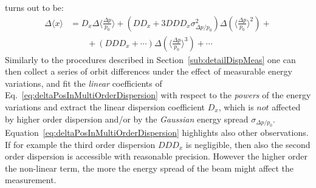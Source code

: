 turns out to be:
%
\begin{align}
\Delta \langle x \rangle &=
D_x \Delta \langle \frac{\Delta p}{p_0} \rangle +
\left( DD_x + 3 DDD_x \sigma_{\Delta p / p_0}^2 \right) \Delta \left( \langle \frac{\Delta p}{p_0} \rangle^2 \right) +
\nonumber \\
&\qquad + \left( DDD_x + \cdots \right) \Delta \left( \langle \frac{\Delta p}{p_0} \rangle^3 \right) + \cdots
\label{eq:deltaPosInMultiOrderDispersion}
\end{align}
%
Similarly to the procedures described in Section~\ref{sub:detailDispMeas} one can then
collect a series of orbit differences under the effect of measurable energy variations,
and fit the \emph{linear} coefficients of 
Eq.~\ref{eq:deltaPosInMultiOrderDispersion} with respect to the \emph{powers} of the
energy variations and extract the linear dispersion coefficient $D_x$, which is $not$
affected by higher order dispersion and/or by the \emph{Gaussian} energy spread
$\sigma_{\Delta p / p_0}$.
Equation~\ref{eq:deltaPosInMultiOrderDispersion} highlights also other observations.
If for example the third order dispersion $DDD_x$ is negligible, then also the second
order dispersion is accessible with reasonable precision.
However the higher order the non-linear term, the more the energy spread of the beam might
affect the measurement.

